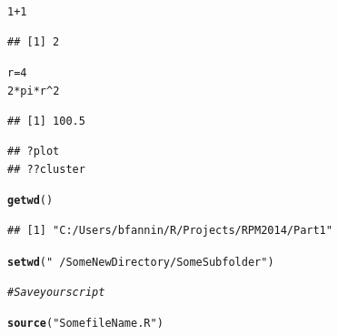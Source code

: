 \documentclass[xcolor=dvipsnames]{beamer}
\makeatletter
\newcommand{\hlnum}[1]{\textcolor[rgb]{0.686,0.059,0.569}{#1}}%
\newcommand{\hlstr}[1]{\textcolor[rgb]{0.192,0.494,0.8}{#1}}%
\newcommand{\hlcom}[1]{\textcolor[rgb]{0.678,0.584,0.686}{\textit{#1}}}%
\newcommand{\hlopt}[1]{\textcolor[rgb]{0,0,0}{#1}}%
\newcommand{\hlstd}[1]{\textcolor[rgb]{0.345,0.345,0.345}{#1}}%
\newcommand{\hlkwb}[1]{\textcolor[rgb]{0.69,0.353,0.396}{#1}}%
\newcommand{\hlkwd}[1]{\textcolor[rgb]{0.737,0.353,0.396}{\textbf{#1}}}%
\newenvironment{kframe}{%
 \def\at@end@of@kframe{}%
 \ifinner\ifhmode%
  \def\at@end@of@kframe{\end{minipage}}%
  \begin{minipage}{\columnwidth}%
 \fi\fi%
 \def\FrameCommand##1{\hskip\@totalleftmargin \hskip-\fboxsep
 \colorbox{shadecolor}{##1}\hskip-\fboxsep
     \hskip-\linewidth \hskip-\@totalleftmargin \hskip\columnwidth}%
 \MakeFramed {\advance\hsize-\width
   \@totalleftmargin\z@ \linewidth\hsize
   \@setminipage}}%
 {\par\unskip\endMakeFramed%
 \at@end@of@kframe}
\newenvironment{knitrout}{}{} %
\makeatother
\begin{document}
\begin{frame}[fragile]
\begin{knitrout}\tiny
{}\color{fgcolor}\begin{kframe}
\begin{alltt}
\hlnum{1} \hlopt{+} \hlnum{1}
\end{alltt}
\begin{verbatim}
## [1] 2
\end{verbatim}
\begin{alltt}
\hlstd{r} \hlkwb{=} \hlnum{4}
\hlnum{2} \hlopt{*} \hlstd{pi} \hlopt{*} \hlstd{r}\hlopt{^}\hlnum{2}
\end{alltt}
\begin{verbatim}
## [1] 100.5
\end{verbatim}
\end{kframe}
\end{knitrout}

\begin{knitrout}\tiny
{}\color{fgcolor}\begin{kframe}
\begin{verbatim}
## ?plot
## ??cluster
\end{verbatim}
\end{kframe}
\end{knitrout}

\begin{knitrout}\tiny
{}\color{fgcolor}\begin{kframe}
\begin{alltt}
\hlkwd{getwd}\hlstd{()}
\end{alltt}
\begin{verbatim}
## [1] "C:/Users/bfannin/R/Projects/RPM2014/Part1"
\end{verbatim}
\end{kframe}
\end{knitrout}

\begin{knitrout}\tiny
{}\color{fgcolor}\begin{kframe}
\begin{alltt}
\hlkwd{setwd}\hlstd{(}\hlstr{"~/SomeNewDirectory/SomeSubfolder"}\hlstd{)}

\hlcom{# Save your script}

\hlkwd{source}\hlstd{(}\hlstr{"SomefileName.R"}\hlstd{)}
\end{alltt}
\end{kframe}
\end{knitrout}

\end{frame}
\end{document}
